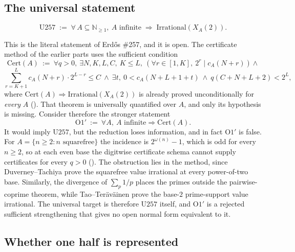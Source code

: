 \subsection{The universal statement}

\begin{defn}[Universal \#257]
\[
\mathrm{U257} \;:=\; \forall\, A\subseteq\mathbb{N}_{\ge 1},\ A\text{ infinite} \;\Longrightarrow\;
\mathrm{Irrational}\!\left(X_{A}(2)\right).
\]
\end{defn}
This is the literal statement of Erd\H{o}s \#257, and it is open.  The certificate method of the
earlier parts uses the sufficient condition
\[
\mathrm{Cert}(A)\ :=\ \forall q>0,\ \exists N,K,L,C,\ K\le L,\
\left(\forall r\in[1,K],\ 2^r\mid c_{A}(N+r)\right)\wedge{}
\]
\[
\sum_{r=K+1}^{L}c_{A}(N+r)\cdot 2^{L-r}\le C\ \wedge\
\exists t,\ 0<c_{A}(N+L+1+t)\ \wedge\ q(C+N+L+2)<2^L,
\]
where $\mathrm{Cert}(A)\Rightarrow \mathrm{Irrational}(X_{A}(2))$ is
already proved unconditionally for \emph{every} $A$
().
That theorem is universally quantified over $A$, and only its hypothesis is missing.  Consider therefore the stronger statement
\[
\mathrm{O1'}\ :=\ \forall A,\ A\text{ infinite}\Longrightarrow \mathrm{Cert}(A).
\]
It would imply $\mathrm{U257}$, but the reduction loses information, and in fact
$\mathrm{O1'}$ is false.  For
$A=\{n\ge2:n\text{ squarefree}\}$ the incidence is
$2^{\omega(n)}-1$, which is odd for every $n\ge2$, so at each even base the digitwise
certificate schema cannot supply certificates for every $q>0$
().
The obstruction lies in the method, since
Duverney--Tachiya prove the squarefree value irrational at every
power-of-two base.  Similarly, the divergence of $\sum_p1/p$ places the
primes outside the pairwise-coprime theorem, while Tao--Ter\"av\"ainen prove
the base-$2$ prime-support value irrational.  The universal target is therefore
$\mathrm{U257}$ itself, and $\mathrm{O1'}$ is a rejected sufficient
strengthening that gives no open normal form equivalent to it.

\subsection{Whether one half is represented}

